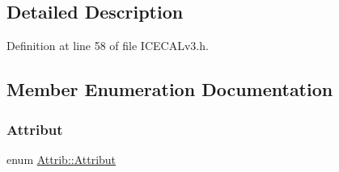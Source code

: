 \subsection{Detailed Description}


Definition at line 58 of file I\+C\+E\+C\+A\+Lv3.\+h.



\subsection{Member Enumeration Documentation}
\mbox{\label{classAttrib_a69e171d7cc6417835a5a306d3c764235}} 
\subsubsection{\texorpdfstring{Attribut}{Attribut}}
{\footnotesize\ttfamily enum \hyperlink{classAttrib_a69e171d7cc6417835a5a306d3c764235}{Attrib\+::\+Attribut}\hspace{0.3cm}{\ttfamily [inherited]}}

